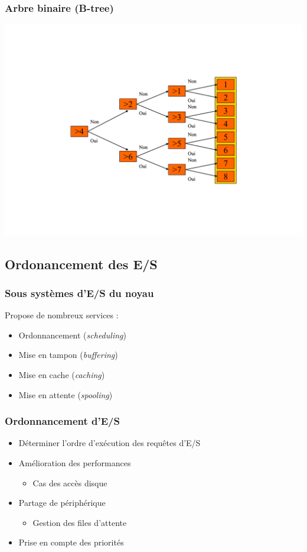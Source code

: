 \begin{frame}
\frametitle{Arbre binaire (B-tree)}
\includegraphics[width=.8\textwidth]{../illustration/b-tree.pdf}
\end{frame}


\subsection{Ordonancement des E/S}

\begin{frame}
\frametitle{Sous systèmes d'E/S du noyau}
Propose de nombreux services :
\begin{itemize}
\item Ordonnancement (\textit{scheduling})
\item Mise en tampon (\textit{buffering})
\item Mise en cache (\textit{caching})
\item Mise en attente (\textit{spooling})
\end{itemize}
\end{frame}

\begin{frame}
\frametitle{Ordonnancement d'E/S}
\begin{itemize}
\item Déterminer l'ordre d'exécution des requêtes d'E/S
\item Amélioration des performances
\begin{itemize}
\item Cas des accès disque
\end{itemize}
\item Partage de périphérique
\begin{itemize}
\item Gestion des files d'attente
\end{itemize}
\item Prise en compte des priorités
\end{itemize}
\end{frame}


